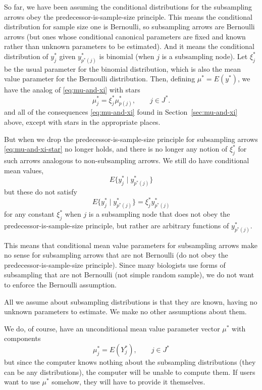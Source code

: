 So far, we have been assuming the conditional distributions for the
subsampling arrows obey the predecessor-is-sample-size principle.  This
means the conditional distribution for sample size one is Bernoulli,
so subsampling arrows are Bernoulli arrows (but ones whose conditional
canonical parameters are fixed and known rather than unknown parameters
to be estimated).  And it means the conditional distribution of $y_j^*$
given $y_{p^*(j)}^*$ is binomial (when $j$ is a subsampling node).
Let $\xi_j^*$ be the usual parameter for the binomial distribution,
which is also the mean value parameter for the Bernoulli distribution.
Then, defining $\mu^* = E(y^*)$, we have
the analog of \eqref{eq:mu-and-xi} with stars
\begin{equation} \label{eq:mu-and-xi-star}
   \mu_j^* = \xi_j^* \mu_{p(j)}^*, \qquad j \in J^*.
\end{equation}
and all of the consequences \eqref{eq:mu-and-xi} found in
Section~\ref{sec:mu-and-xi} above, except with stars in the appropriate places.

But when we drop the predecessor-is-sample-size principle for subsampling
arrows \eqref{eq:mu-and-xi-star} no longer holds, and there is no longer
any notion of $\xi^*_j$ for such arrows analogous to non-subsampling
arrows.  We still do have conditional mean values,
$$
   E\bigl\{ y_j^* \mid y_{p^*(j)}^*\bigr\}
$$
but these do not satisfy
$$
   E\bigl\{ y_j^* \mid y_{p^*(j)}^*\bigr\}
   =
   \xi_j^* y_{p^*(j)}^*
$$
for any constant $\xi_j^*$ when $j$ is a subsampling node that does not
obey the predecessor-is-sample-size principle, but rather are arbitrary
functions of $y_{p^*(j)}^*$.

This means that conditional mean value parameters
for subsampling arrows make no sense for subsampling arrows that are not
Bernoulli (do not obey the predecessor-is-sample-size principle).
Since many biologists use forms of subsampling that are not Bernoulli
(not simple random sample), we do not want to enforce the Bernoulli
assumption.

All we assume about subsampling distributions is that they are known,
having no unknown parameters to estimate.
We make no other assumptions about them.

We do, of course, have an unconditional mean value parameter vector $\mu^*$
with components
\begin{equation} \label{eq:mu-star}
   \mu^*_j = E(Y^*_j), \qquad j \in J^*
\end{equation}
but since the computer knows nothing about the subsampling distributions
(they can be any distributions), the computer will be unable to compute
them.  If users want to use $\mu^*$ somehow, they will have to provide
it themselves.

